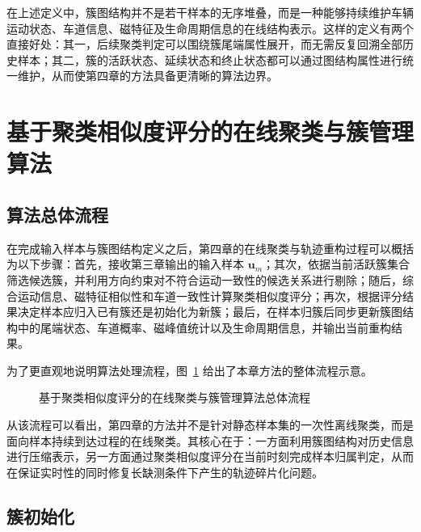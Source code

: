 \documentclass{xdupgthesis}
\begin{document}
在上述定义中，簇图结构并不是若干样本的无序堆叠，而是一种能够持续维护车辆运动状态、车道信息、磁特征及生命周期信息的在线结构表示。这样的定义有两个直接好处：其一，后续聚类判定可以围绕簇尾端属性展开，而无需反复回溯全部历史样本；其二，簇的活跃状态、延续状态和终止状态都可以通过图结构属性进行统一维护，从而使第四章的方法具备更清晰的算法边界。

\section{基于聚类相似度评分的在线聚类与簇管理算法}

\subsection{算法总体流程}

在完成输入样本与簇图结构定义之后，第四章的在线聚类与轨迹重构过程可以概括为以下步骤：首先，接收第三章输出的输入样本 $\mathbf{u}_m$；其次，依据当前活跃簇集合筛选候选簇，并利用方向约束对不符合运动一致性的候选关系进行剔除；随后，综合运动信息、磁特征相似性和车道一致性计算聚类相似度评分；再次，根据评分结果决定样本应归入已有簇还是初始化为新簇；最后，在样本归簇后同步更新簇图结构中的尾端状态、车道概率、磁峰值统计以及生命周期信息，并输出当前重构结果。

为了更直观地说明算法处理流程，图~\ref{fig:4_1_algorithm_flow} 给出了本章方法的整体流程示意。

\begin{figure}[H]
	\centering
	\caption{基于聚类相似度评分的在线聚类与簇管理算法总体流程}
	\label{fig:4_1_algorithm_flow}
\end{figure}

从该流程可以看出，第四章的方法并不是针对静态样本集的一次性离线聚类，而是面向样本持续到达过程的在线聚类。其核心在于：一方面利用簇图结构对历史信息进行压缩表示，另一方面通过聚类相似度评分在当前时刻完成样本归属判定，从而在保证实时性的同时修复长缺测条件下产生的轨迹碎片化问题。

\subsection{簇初始化}
\end{document}

